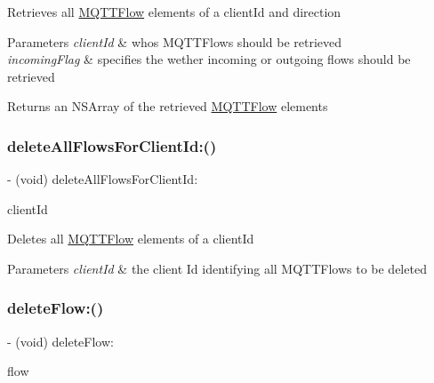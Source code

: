Retrieves all \hyperlink{interface_m_q_t_t_flow}{M\+Q\+T\+T\+Flow} elements of a client\+Id and direction 
\begin{DoxyParams}{Parameters}
{\em client\+Id} & whos M\+Q\+T\+T\+Flows should be retrieved \\
\hline
{\em incoming\+Flag} & specifies the wether incoming or outgoing flows should be retrieved \\
\hline
\end{DoxyParams}
\begin{DoxyReturn}{Returns}
an N\+S\+Array of the retrieved \hyperlink{interface_m_q_t_t_flow}{M\+Q\+T\+T\+Flow} elements 
\end{DoxyReturn}
\mbox{\label{protocol_m_q_t_t_persistence-p_a2c880d902ade2b17078545cef8d212e7}} 
\subsubsection{\texorpdfstring{delete\+All\+Flows\+For\+Client\+Id\+:()}{deleteAllFlowsForClientId:()}}
{\footnotesize\ttfamily -\/ (void) delete\+All\+Flows\+For\+Client\+Id\+: \begin{DoxyParamCaption}\item[{(N\+S\+String $\ast$)}]{client\+Id }\end{DoxyParamCaption}}

Deletes all \hyperlink{interface_m_q_t_t_flow}{M\+Q\+T\+T\+Flow} elements of a client\+Id 
\begin{DoxyParams}{Parameters}
{\em client\+Id} & the client Id identifying all M\+Q\+T\+T\+Flows to be deleted \\
\hline
\end{DoxyParams}
\mbox{\label{protocol_m_q_t_t_persistence-p_a415cc2c67ea2e73d7942973a2186d083}} 
\subsubsection{\texorpdfstring{delete\+Flow\+:()}{deleteFlow:()}}
{\footnotesize\ttfamily -\/ (void) delete\+Flow\+: \begin{DoxyParamCaption}\item[{(id$<$ \hyperlink{interface_m_q_t_t_flow}{M\+Q\+T\+T\+Flow} $>$)}]{flow }\end{DoxyParamCaption}}

